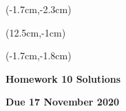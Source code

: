 \documentclass[12pt, oneside]{article}
\begin{document}
\begin{textblock*}{4cm}(-1.7cm,-2.3cm)
\end{textblock*}

\begin{textblock*}{8cm}(12.5cm,-1cm)
\end{textblock*}
\begin{textblock*}{13.5cm}(-1.7cm,-1.8cm)
\end{textblock*}

\vspace{1cm}

\begin{center}
\textbf{\Large Homework 10 Solutions}

\textbf{Due 17 November 2020}
\end{center}
\end{document}
